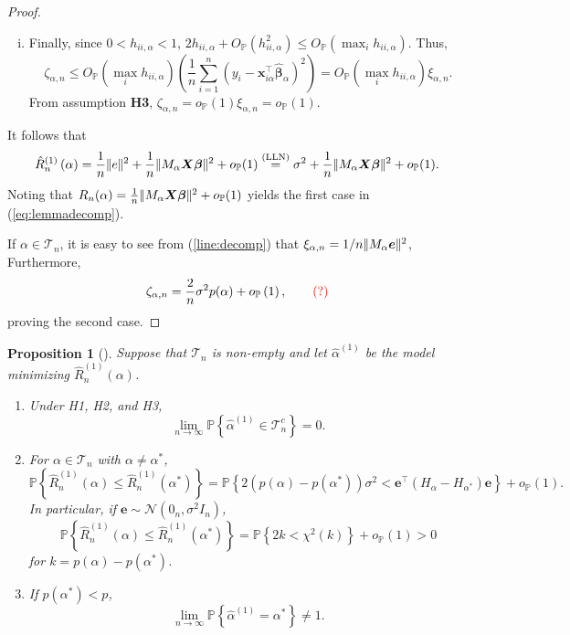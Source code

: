 \documentclass[12pt, letter paper]{article}
\newcommand{\1}{\mathmybb{1}}
\newtheorem{proposition}{Proposition}[section]
\newcommand{\0}{\emptyset}
\newcommand{\prob}{\mathbb{P}}
\newcommand{\paren}[1]{\left(#1 \right)}
\newcommand{\set}[1]{\left\{ #1 \right\}}
\newcommand{\norm}[1]{|\hspace{-1pt}|#1 |\hspace{-1pt}|}
\newcommand{\normsq}[1]{\norm{#1}^{2}}
\newcommand{\Tcal}{\mathcal{T}_{n}}
\newcommand{\Ncal}{\mathcal{N}}
\newcommand{\X}{\boldsymbol{X}}
\newcommand{\x}{\boldsymbol{x}}
\newcommand{\e}{\boldsymbol{e}}
\newcommand{\bbeta}{\boldsymbol{\beta}}
\newcommand{\bbetahat}{\boldsymbol{\hat{\beta}}}
\newcommand{\alphahat}[1]{\hat{\alpha}^{#1}}
\newcommand{\lev}{h_{ii,\alpha}}
\newcommand{\loocv}[1]{\hat{R}^{(1)}_{n}\paren{#1}}
\newcommand{\op}[1]{o_{\prob}\paren{#1}}
\newcommand{\Op}[1]{O_{\prob}\paren{#1}}
\begin{document}
\begin{proof}
\begin{enumerate}[i.]
        \item Finally, since \(0<\lev<1\), \(2\lev + \Op{\lev^{2}}\leq\Op{\max_{i}\lev}\). Thus,
        \[\zeta_{\alpha,n}\leq\Op{\max_{i}\lev}\paren{\frac{1}{n}\sum_{i=1}^{n}\paren{y_{i} - \x_{i\alpha}^{\top}\bbetahat_{\alpha}}^{2}} = \Op{\max_{i}\lev}\xi_{\alpha,n}.\]
        From assumption \textbf{H3}, \(\zeta_{\alpha,n} = o_{\prob}(1)\xi_{\alpha,n} = o_{\prob}(1)\).
    \end{enumerate}
    It follows that 
    \[\loocv{\alpha} = \frac{1}{n}\normsq{e} + \frac{1}{n}\normsq{M_{\alpha}\X\bbeta} + o_{\prob}(1) \stackrel{(\mathrm{LLN})}{=} \sigma^{2} + \frac{1}{n}\normsq{M_{\alpha}\X\bbeta} + o_{\prob}(1).\]
    Noting that \(R_{n}(\alpha) = \frac{1}{n}\normsq{M_{\alpha}\X\bbeta} + o_{\prob}(1)\) yields the first case in (\ref{eq:lemmadecomp}).

    If \(\alpha\in\Tcal\), it is easy to see from (\ref{line:decomp}) that \(\xi_{\alpha,n} = 1/n\normsq{M_{\alpha}\e}\), Furthermore,
    \[\zeta_{\alpha,n} = \frac{2}{n}\sigma^{2}p(\alpha) + \op{1},\qquad\textcolor{red}{(?)}\]
    proving the second case.
\end{proof}

\begin{proposition}[\cite{shao_1993}]
    Suppose that \(\Tcal\) is non-empty and let \(\alphahat{(1)}\) be the model minimizing \(\loocv{\alpha}\).
    \begin{enumerate}
        \item Under H1, H2, and H3, \[\lim_{n\to\infty}\prob\set{\alphahat{(1)}\in\Tcal^{c}}=0.\]
        \item For \(\alpha\in\Tcal\) with \(\alpha\neq\alpha^{*}\),\[\prob\set{\loocv{\alpha}\leq \loocv{\alpha^{*}}} = \prob\set{2\paren{p(\alpha) - p(\alpha^{*})}\sigma^{2} < \e^{\top}(H_{\alpha} - H_{\alpha^{*}})\e} + \op{1}.\] In particular, if \(\e\sim\Ncal(0_{n}, \sigma^{2}I_n)\), \[\prob\set{\loocv{\alpha}\leq \loocv{\alpha^{*}}} = \prob\set{2k < \chi^{2}(k)} + \op{1} > 0\] for \(k=p(\alpha) - p(\alpha^{*})\).
        \item If \(p(\alpha^*) < p\), \[\lim_{n\to\infty}\prob\set{\alphahat{(1)}=\alpha^{*}}\neq 1.\]
    \end{enumerate}
\end{proposition}
\end{document}
